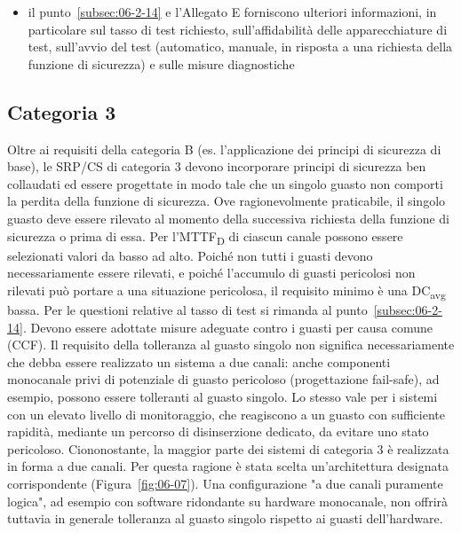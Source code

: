 \begin{itemize}
    \item il punto~\ref{subsec:06-2-14} e l'Allegato E forniscono ulteriori informazioni, in particolare sul tasso di test richiesto, sull'affidabilità delle apparecchiature di test, sull'avvio del test (automatico, manuale, in risposta a una richiesta della funzione di sicurezza) e sulle misure diagnostiche
\end{itemize}

\subsection{Categoria 3}
\label{subsec:06-2-6}
Oltre ai requisiti della categoria B (es. l'applicazione dei principi di sicurezza di base), le SRP/CS di categoria 3 devono incorporare principi di sicurezza ben collaudati ed essere progettate in modo tale che un singolo guasto non comporti la perdita della funzione di sicurezza. Ove ragionevolmente praticabile, il singolo guasto deve essere rilevato al momento della successiva richiesta della funzione di sicurezza o prima di essa.
Per l'MTTF\textsubscript{D} di ciascun canale possono essere selezionati valori da basso ad alto. Poiché non tutti i guasti devono necessariamente essere rilevati, e poiché l'accumulo di guasti pericolosi non rilevati può portare a una situazione pericolosa, il requisito minimo è una DC\textsubscript{avg} bassa. Per le questioni relative al tasso di test si rimanda al punto~\ref{subsec:06-2-14}. Devono essere adottate misure adeguate contro i guasti per causa comune (CCF).
Il requisito della tolleranza al guasto singolo non significa necessariamente che debba essere realizzato un sistema a due canali: anche componenti monocanale privi di potenziale di guasto pericoloso (progettazione fail-safe), ad esempio, possono essere tolleranti al guasto singolo. Lo stesso vale per i sistemi con un elevato livello di monitoraggio, che reagiscono a un guasto con sufficiente rapidità, mediante un percorso di disinserzione dedicato, da evitare uno stato pericoloso. Ciononostante, la maggior parte dei sistemi di categoria 3 è realizzata in forma a due canali. Per questa ragione è stata scelta un'architettura designata corrispondente (Figura~\ref{fig:06-07}). Una configurazione "a due canali puramente logica", ad esempio con software ridondante su hardware monocanale, non offrirà tuttavia in generale tolleranza al guasto singolo rispetto ai guasti dell'hardware.

\begin{center}
    \begin{minipage}{\textwidth}
        \centering
        \captionsetup{hypcap=false}
        \resizebox{0.85\textwidth}{!}{}
        \label{fig:06-07}
    \end{minipage}
\end{center}


